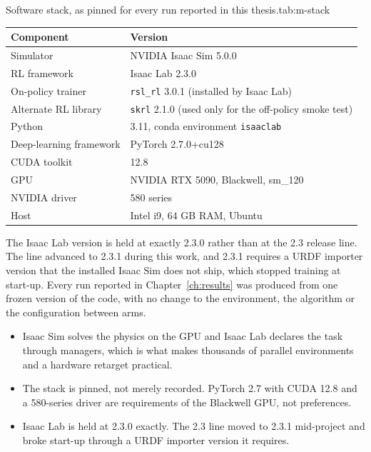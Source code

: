 \begin{kuettable}{Software stack, as pinned for every run reported in this thesis.}{tab:m-stack}
\begin{tabular*}{\textwidth}{@{\extracolsep{\fill}}p{}p{}}
\toprule
Component & Version\\
\midrule
Simulator & NVIDIA Isaac Sim 5.0.0\\
RL framework & Isaac Lab 2.3.0\\
On-policy trainer & \texttt{rsl\_rl} 3.0.1 (installed by Isaac Lab)\\
Alternate RL library & \texttt{skrl} 2.1.0 (used only for the off-policy smoke test)\\
Python & 3.11, conda environment \texttt{isaaclab}\\
Deep-learning framework & PyTorch 2.7.0+cu128\\
CUDA toolkit & 12.8\\
GPU & NVIDIA RTX 5090, Blackwell, sm\_120\\
NVIDIA driver & 580 series\\
Host & Intel i9, 64 GB RAM, Ubuntu\\
\bottomrule
\end{tabular*}
\end{kuettable}

The Isaac Lab version is held at exactly 2.3.0 rather than at the 2.3 release line. The line
advanced to 2.3.1 during this work, and 2.3.1 requires a URDF importer version that the installed
Isaac Sim does not ship, which stopped training at start-up. Every run reported in
Chapter~\ref{ch:results} was produced from one frozen version of the code, with no change to the
environment, the algorithm or the configuration between arms.

\begin{keypoints}
\begin{itemize}\tightlist
\item Isaac Sim solves the physics on the GPU and Isaac Lab declares the task through managers,
which is what makes thousands of parallel environments and a hardware retarget practical.
\item The stack is pinned, not merely recorded. PyTorch 2.7 with CUDA 12.8 and a 580-series driver
are requirements of the Blackwell GPU, not preferences.
\item Isaac Lab is held at 2.3.0 exactly. The 2.3 line moved to 2.3.1 mid-project and broke
start-up through a URDF importer version it requires.
\end{itemize}
\end{keypoints}

